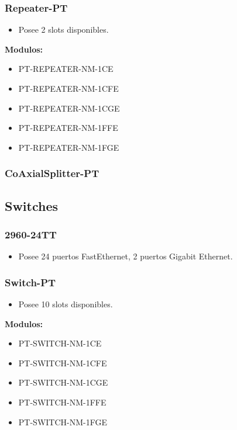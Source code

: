 \documentclass{article}
\begin{document}
\subsubsection{Repeater-PT}
\begin{itemize}
    \item Posee 2 slots disponibles.
\end{itemize}
\textbf{Modulos:}
\begin{itemize}
    \item PT-REPEATER-NM-1CE
    \item PT-REPEATER-NM-1CFE
    \item PT-REPEATER-NM-1CGE
    \item PT-REPEATER-NM-1FFE
    \item PT-REPEATER-NM-1FGE
\end{itemize}

\subsubsection{CoAxialSplitter-PT} 
\textbf{}

\subsection{Switches}

\subsubsection{2960-24TT}
\begin{itemize}
    \item Posee 24 puertos FastEthernet, 2 puertos Gigabit Ethernet.
\end{itemize}

\subsubsection{Switch-PT}
\begin{itemize}
    \item Posee 10 slots disponibles.
\end{itemize}
\textbf{Modulos:}
\begin{itemize}
    \item PT-SWITCH-NM-1CE
    \item PT-SWITCH-NM-1CFE
    \item PT-SWITCH-NM-1CGE
    \item PT-SWITCH-NM-1FFE
    \item PT-SWITCH-NM-1FGE
\end{itemize}
\end{document}
